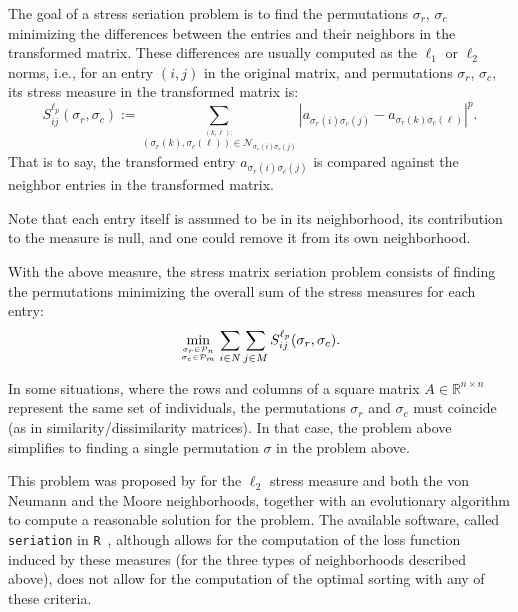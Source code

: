 \documentclass[a4paper,11pt, reqno]{amsart}
\def\R{\mathbb{R}}
\begin{document}
The goal of a stress seriation problem is to find the permutations $\sigma_r$, $\sigma_c$ minimizing the differences between the entries and their neighbors in the transformed matrix. These differences are usually computed as the $\ell_1$ or $\ell_2$ norms, i.e., for an entry $(i,j)$ in the original matrix, and permutations $\sigma_r$, $\sigma_c$, its stress measure in the transformed matrix is:
\begin{equation}\label{eq:stress:lp}
S^{\ell_p}_{ij}(\sigma_r,\sigma_c) := 
\sum_{\stackrel{(k,\ell ):}{(\sigma_r(k),\sigma_c(\ell )) \in 
\mathcal{N}_{\sigma_r(i)\sigma_r(j)}}} 
|a_{\sigma_r(i)\sigma_c(j)} - a_{\sigma_r(k)\sigma_c(\ell )}|^p.
\end{equation}
That is to say, the transformed entry $a_{\sigma_r(i)\sigma_c(j)}$ is compared against the neighbor entries in the transformed matrix.

Note that each entry itself is assumed to be in its neighborhood, its contribution to the measure is null, and one could remove it from its own neighborhood.

With the above measure, the stress matrix seriation problem consists of finding the permutations minimizing the overall sum of the stress measures for each entry:
\begin{equation}\label{eq:stressmin}
\min_{ \sigma_r \in \mathcal{P}_n\atop\sigma_c \in \mathcal{P}_m} 
\sum_{i\in N} \sum_{j \in M} S^{\ell_p}_{ij}(\sigma_r,\sigma_c).
\end{equation}

In some situations, where the rows and columns of a square matrix $A \in \R^{n\times n}$ represent the same set of individuals, the permutations $\sigma_r$ and $\sigma_c$ must coincide (as in similarity/dissimilarity matrices). In that case, the problem above simplifies to finding a single permutation $\sigma$ in the problem above.

This problem was proposed by  \cite{niermann2005optimizing} for the $\ell_2$ stress measure and both the von Neumann and the Moore neighborhoods, together with an evolutionary algorithm to compute a reasonable solution for the problem. The available software, called \texttt{seriation} in \texttt{R}~\citep{hahsler2008getting}, although allows for the computation of the loss function induced by these measures (for the three types of neighborhoods described above), does not allow for the computation of the optimal sorting with any of these criteria.
\end{document}
